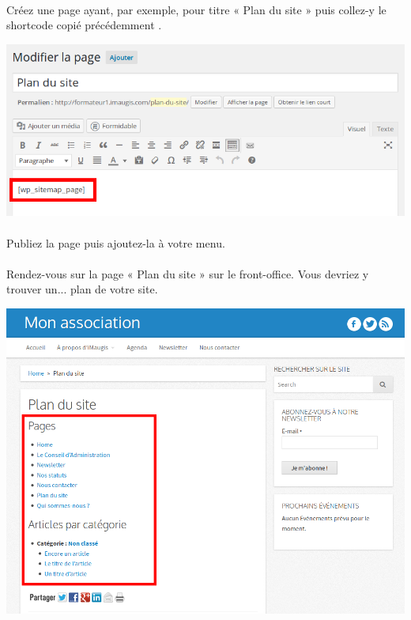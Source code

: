 \documentclass[10pt,a4paper]{article}
\begin{document}
\paragraph{}Créez une page ayant, par exemple, pour titre « Plan du site » puis collez-y le shortcode copié précédemment .
\begin{center}
\includegraphics[scale=0.3]{img/0267.png}
\end{center}
\paragraph{}Publiez la page puis ajoutez-la à votre menu.
\paragraph{}Rendez-vous sur la page « Plan du site » sur le front-office. Vous devriez y trouver un... plan de votre site.
\begin{center}
\includegraphics[scale=0.3]{img/0268.png}
\end{center}
\newpage
\end{document}
